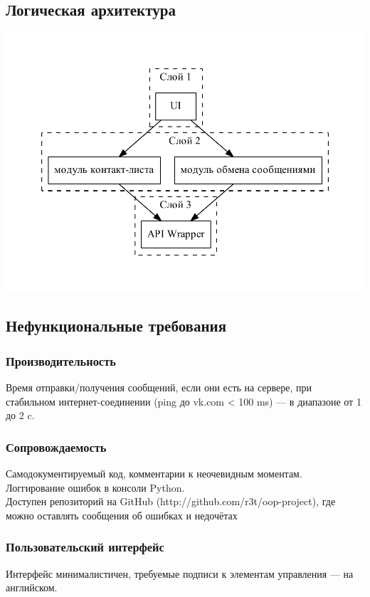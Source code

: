 \documentclass[12pt]{article}
\begin{document}
\subsection{Логическая архитектура}
\includegraphics{../HLA/diag/logic.pdf}

\subsection{Нефункциональные требования}

\subsubsection*{Производительность}
Время отправки/получения сообщений, если они есть на сервере, при стабильном интернет-соединении (ping до vk.com < 100 ms) — в диапазоне от 1 до 2 c.

\subsubsection{Сопровождаемость}
Самодокументируемый код, комментарии к неочевидным моментам. Логгирование ошибок в консоли Python. \\
Доступен репозиторий на GitHub (http://github.com/r3t/oop-project), где можно оставлять сообщения об ошибках и недочётах

\subsubsection{Пользовательский интерфейс}
Интерфейс минималистичен, требуемые подписи к элементам управления — на английском.
\end{document}
